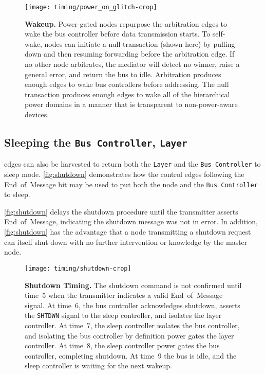 \begin{figure}
  \centering
  \texttt{[image: timing/power\_on\_glitch-crop]}
  \caption{\textbf{\bus Wakeup.} \textmd{
      Power-gated nodes repurpose the arbitration edges to wake the bus
      controller before data transmission starts. To self-wake, nodes can
      initiate a null transaction (shown here) by pulling down \DAT and then
      resuming forwarding \DAT before the arbitration edge. If no other node
      arbitrates, the mediator will detect no winner, raise a general error,
      and return the bus to idle.
      Arbitration produces enough edges to wake bus controllers before
      addressing. The null transaction produces enough edges to wake all of
      the \bus hierarchical power domains in a manner that is transparent to
      non-power-aware devices.
  }}
  \label{fig:glitch}
\end{figure}

\subsection{Sleeping the {\tt Bus Controller}, {\tt Layer}}
\bus edges can also be harvested to return both the {\tt Layer} and the
{\tt Bus~Controller} to sleep mode. \autoref{fig:shutdown} demonstrates how
the control edges following the End~of~Message bit may be used to put both the
node and the {\tt Bus~Controller} to sleep.

\autoref{fig:shutdown} delays the shutdown procedure until the transmitter
asserts End~of~Message, indicating the shutdown message was not in error.
In addition, \autoref{fig:shutdown} has the advantage that a node transmitting
a shutdown request can itself shut down with no further intervention or
knowledge by the master node.

\begin{figure}
  \centering
  \texttt{[image: timing/shutdown-crop]}
  \caption{\textbf{Shutdown Timing.} \textmd{
    The shutdown command is not confirmed until time~5 when the transmitter
    indicates a valid End~of~Message signal. At time~6, the bus controller
    acknowledges shutdown, asserts the {\tt SHTDWN} signal to the sleep
    controller, and isolates the layer controller. At time~7, the sleep
    controller isolates the bus controller, and isolating the bus controller
    by definition power gates the layer controller. At time~8, the sleep
    controller power gates the bus controller, completing shutdown. At time~9
    the bus is idle, and the sleep controller is waiting for the next wakeup.
  }}
  \label{fig:shutdown}
\end{figure}

